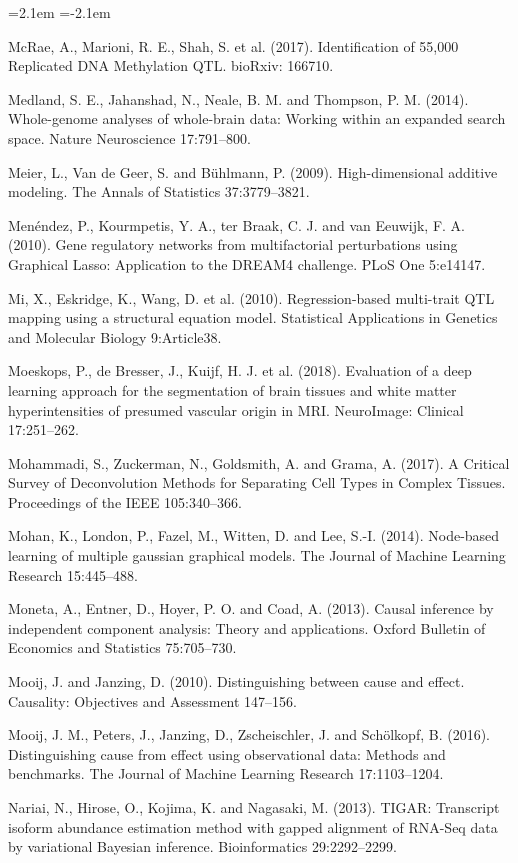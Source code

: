 \begin{list}{}{\leftmargin=2.1em  
  \itemindent=-2.1em \parsep=0pt \itemsep=2pt \topsep=0pt}
\item McRae, A., Marioni, R. E., Shah, S. et al. (2017). Identification of 55,000 Replicated DNA Methylation QTL. bioRxiv: 166710.
\item Medland, S. E., Jahanshad, N., Neale, B. M. and Thompson, P. M. (2014). Whole-genome analyses of whole-brain data: Working within an expanded search space. Nature Neuroscience 17:791--800.
\item Meier, L., Van de Geer, S. and Bühlmann, P. (2009). High-dimensional additive modeling. The Annals of Statistics 37:3779--3821.
\item Menéndez, P., Kourmpetis, Y. A., ter Braak, C. J. and van Eeuwijk, F. A. (2010). Gene regulatory networks from multifactorial perturbations using Graphical Lasso: Application to the DREAM4 challenge. PLoS One 5:e14147.
\item Mi, X., Eskridge, K., Wang, D. et al. (2010). Regression-based multi-trait QTL mapping using a structural equation model. Statistical Applications in Genetics and Molecular Biology 9:Article38.
\item Moeskops, P., de Bresser, J., Kuijf, H. J. et al. (2018). Evaluation of a deep learning approach for the segmentation of brain tissues and white matter hyperintensities of presumed vascular origin in MRI. NeuroImage: Clinical 17:251--262.
\item Mohammadi, S., Zuckerman, N., Goldsmith, A. and Grama, A. (2017). A Critical Survey of Deconvolution Methods for Separating Cell Types in Complex Tissues. Proceedings of the IEEE 105:340--366.
\item Mohan, K., London, P., Fazel, M., Witten, D. and Lee, S.-I. (2014). Node-based learning of multiple gaussian graphical models. The Journal of Machine Learning Research 15:445--488.
\item Moneta, A., Entner, D., Hoyer, P. O. and Coad, A. (2013). Causal inference by independent component analysis: Theory and applications. Oxford Bulletin of Economics and Statistics 75:705--730.
\item Mooij, J. and Janzing, D. (2010). Distinguishing between cause and effect. Causality: Objectives and Assessment 147--156.
\item Mooij, J. M., Peters, J., Janzing, D., Zscheischler, J. and Schölkopf, B. (2016). Distinguishing cause from effect using observational data: Methods and benchmarks. The Journal of Machine Learning Research 17:1103--1204.
\item Nariai, N., Hirose, O., Kojima, K. and Nagasaki, M. (2013). TIGAR: Transcript isoform abundance estimation method with gapped alignment of RNA-Seq data by variational Bayesian inference. Bioinformatics 29:2292--2299.

\end{list}
